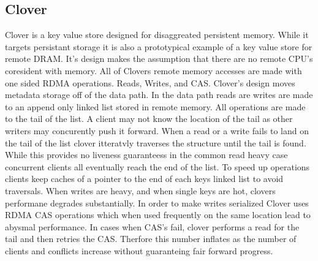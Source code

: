 \subsection{Clover}

Clover is a key value store designed for disaggreated persistent memory. While
it targets persistant storage it is also a prototypical example of a key value
store for remote DRAM. It's design makes the assumption that there are no remote
CPU's coresident with memory. All of Clovers remote memory accesses are made
with one sided RDMA operations. Reads, Writes, and CAS. Clover's design moves
metadata storage off of the data path. In the data path reads are writes are
made to an append only linked list stored in remote memory. All operations are
made to the tail of the list. A client may not know the location of the tail as
other writers may concurently push it forward. When a read or a write fails to
land on the tail of the list clover itteratvly traverses the structure until the
tail is found. While this provides no liveness guaranteess in the common read
heavy case concurrent clients all eventually reach the end of the list. To speed
up operations clients keep caches of a pointer to the end of each keys linked
list to avoid traversals. When writes are heavy, and when single keys are hot,
clovers performane degrades substantially. In order to make writes serialized
Clover uses RDMA CAS operations which when used frequently on the same location
lead to abysmal performance. In cases when CAS's fail, clover performs a read
for the tail and then retries the CAS. Therfore this number inflates as the
number of clients and conflicts increase without guaranteing fair forward
progress.

